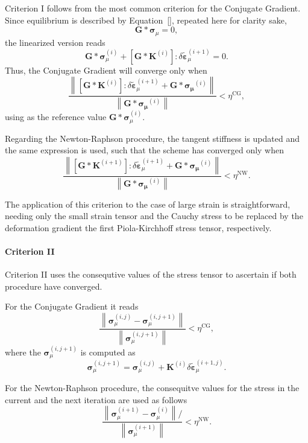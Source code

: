 Criterion I follows from the most common criterion for the Conjugate Gradient.
Since equilibrium is described by Equation~\eqref{}, repeated here for clarity sake,
\begin{equation}
  \bm G * \bm \sigma_\mu = 0,
\end{equation}
the linearized version reads
\begin{equation}
\bm G * \bm \sigma_\mu^{(i)} + [\bm G * \bm K^{(i)}]:\delta \tilde{\bm \varepsilon}_\mu^{(i+1)} = 0.
\end{equation}
Thus, the Conjugate Gradient will converge only when
\begin{equation}
\frac{\displaystyle{\left\|[\bm{G}* \bm{K}^{(i)}]: \delta \tilde{\bm{\varepsilon} }_\mu^{(i+1)}+\bm{G}* \bm{\sigma_\mu}^{(i)}\right\|}}{\displaystyle{\left\|\bm{G}* \bm{\sigma_\mu}^{(i)}\right\|}}<\eta^{\mathrm{CG}},
\end{equation}
using as the reference value \(\bm G*\bm \sigma_\mu^{(i)}\).

Regarding the Newton-Raphson procedure, the tangent stiffness is updated and the same expression is used, such that the scheme has converged only when
\begin{equation}
\frac{\displaystyle{\left\|[\bm{G}* \bm{K}^{(i+1)}]: \delta \tilde{\bm{\varepsilon} }_\mu^{(i+1)}+\bm{G}* \bm{\sigma_\mu}^{(i)}\right\|}}{\displaystyle{\left\|\bm{G}* \bm{\sigma_\mu}^{(i)}\right\|}}<\eta^{\mathrm{NW}}.
\end{equation}

The application of this criterion to the case of large strain is straightforward, needing only the small strain tensor and the Cauchy stress to be replaced by the deformation gradient the first Piola-Kirchhoff stress tensor, respectively.

\paragraph{Criterion II}

Criterion II uses the consequtive values of the stress tensor to ascertain if both procedure have converged.

For the Conjugate Gradient it reads
\begin{equation}
\frac{\displaystyle{\left\|\bm \sigma_\mu^{(i,j)}-\bm \sigma_\mu^{(i,j+1)}\right\|}}{\displaystyle{\left\|\bm \sigma_\mu^{(i,j+1)}\right\|}}<\eta^{\mathrm{CG}},
\end{equation}
where the \(\bm \sigma_\mu^{(i,j+1)}\) is computed as
\begin{equation}
  \bm \sigma_\mu^{(i,j+1)} = \bm \sigma_\mu^{(i,j)}+ \bm K^{(i)} \delta \tilde{\bm \varepsilon}_\mu^{(i+1,j)}.
\end{equation}

For the Newton-Raphson procedure, the consequitve values for the stress in the current and the next iteration are used as follows
\begin{equation}
\frac{\displaystyle{\left\|\bm \sigma_\mu^{(i+1)}-\bm \sigma_\mu^{(i)}\right\|/}}{\displaystyle{\left\|\bm \sigma_\mu^{(i+1)}\right\|}}<\eta^{\mathrm{NW}}.
\end{equation}
